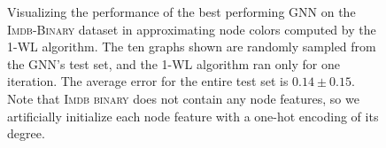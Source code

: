 \begin{figure}[!ht]
\begin{minipage}[b]{0.53007147296\textwidth}
    \end{minipage}
    \hfill
    \caption{Visualizing the performance of the best performing GNN on the \textsc{Imdb-Binary} dataset in approximating node colors computed by the 1-WL algorithm. The ten graphs shown are randomly sampled from the GNN's test set, and the 1-WL algorithm ran only for one iteration. The average error for the entire test set is $0.14 \pm 0.15$. \newline
    Note that \textsc{Imdb binary} does not contain any node features, so we artificially initialize each node feature with a one-hot encoding of its degree.}
\end{figure}

\begin{figure}[!ht]
    \centering
    \begin{subfigure}[b]{0.45992852703\textwidth}
        \centering

\end{subfigure}
\end{figure}
